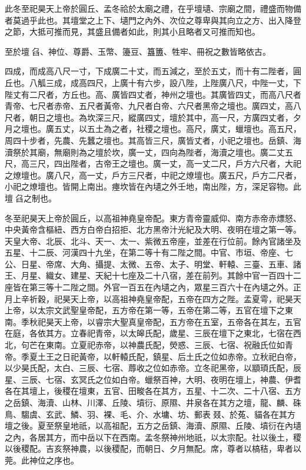\begin{pinyinscope}
 此冬至祀昊天上帝於圓丘、孟冬祫於太廟之禮，在乎壇壝、宗廟之間，禮盛而物備者莫過乎此也。其壇堂之上下、壝門之內外、次位之尊卑與其向立之方、出入降登之節，大抵可推而見，其盛且備者如此，則其小且略者又可推而知也。



 至於壇臽、神位、尊爵、玉幣、籩豆、簋簠、牲牢、冊祝之數皆略依古。



 四成，而成高八尺一寸，下成廣二十丈，而五減之，至於五丈，而十有二陛者，圓丘也。八觚三成，成高四尺，上廣十有六步，設八陛，上陛廣八尺，中陛一丈，下陛丈有二尺者，方丘也。高、廣皆四丈者，神州之壇也。其廣皆四丈，而高八尺者青帝、七尺者赤帝、五尺者黃帝、九尺者白帝、六尺者黑帝之壇也。廣四丈，高八尺者，朝日之壇也。為坎深三尺，縱廣四丈，壇於其中，高一尺，方廣四丈者，夕月之壇也。廣五丈，以五土為之者，社稷之壇也。高尺，廣丈，蠟壇也。高五尺，周四十步者，先農、先蠶之壇也。其高皆三尺，廣皆丈者，小祀之壇也。岳鎮、海瀆祭於其廟，無廟則為之壇於坎，廣一丈，四向為陛者，海瀆之壇也。廣二丈五尺，高三尺，四出陛者，古帝王之壇也。廣一丈，高一丈二尺，戶方六尺者，大祀之燎壇也。廣八尺，高一丈，戶方三尺者，中祀之燎壇也。廣五尺，戶方二尺者，小祀之燎壇也。皆開上南出。瘞坎皆在內壝之外壬地，南出陛，方，深足容物。此壇臽之制也。



 冬至祀昊天上帝於圓丘，以高祖神堯皇帝配。東方青帝靈威仰、南方赤帝赤熛怒、中央黃帝含樞紐、西方白帝白招拒、北方黑帝汁光紀及大明、夜明在壇之第一等。天皇大帝、北辰、北斗、天一、太一、紫微五帝座，並差在行位前。餘內官諸坐及五星、十二辰、河漢四十九坐，在第二等十有二陛之間。中官、市垣、帝座、七公、日星、帝席、大角、攝提、太微、五帝、太子、明堂、軒轅、三臺、五車、諸王、月星、織女、建星、天紀十七座及二十八宿，差在前列。其餘中官一百四十二座皆在第三等十二陛之間。外官一百五在內壝之內，眾星三百六十在內壝之外。正月上辛祈穀，祀昊天上帝，以高祖神堯皇帝配，五帝在四方之陛。孟夏雩，祀昊天上帝，以太宗文武聖皇帝配，五方帝在第一等，五帝在第二等，五官在壇下之東南。季秋祀昊天上帝，以睿宗大聖真皇帝配，五方帝在五室，五帝各在其左，五官在庭，各依其方。立春祀青帝，以太皞氏配，歲星、三辰在壇下之東北，七宿在西北，句芒在東南。立夏祀赤帝，以神農氏配，熒惑、三辰、七宿、祝融氏位如青帝。季夏土王之日祀黃帝，以軒轅氏配，鎮星、后土氏之位如赤帝。立秋祀白帝，以少昊氏配，太白、三辰、七宿、蓐收之位如赤帝。立冬祀黑帝，以顓頊氏配，辰星、三辰、七宿、玄冥氏之位如白帝。蠟祭百神，大明、夜明在壇上，神農、伊耆各在其壇上，後稷在壇東，五官、田畯各在其方，五星、十二次、二十八宿、五方之岳鎮、海瀆、山林、川澤、丘陵、墳衍、原隰、井泉各在其方之壇，龍、麟、硃鳥、騶虞、玄武、鱗、羽、裸、毛、介、水墉、坊、郵表叕、於菟、貓各在其方壇之後。夏至祭皇地祇，以高祖配，五方之岳鎮、海瀆、原隰、丘陵、墳衍在內壝之內，各居其方，而中岳以下在西南。孟冬祭神州地祇，以太宗配。社以後土，稷以後稷配。吉亥祭神農，以後稷配，而朝日、夕月無配。席，尊者以槁秸，卑者以莞。此神位之序也。




\end{pinyinscope}
